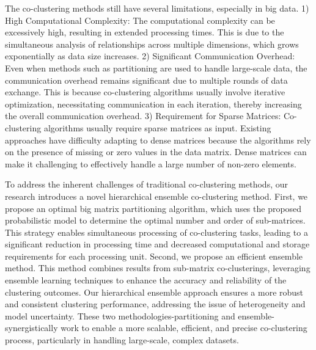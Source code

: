 The co-clustering methods still have several limitations, especially in big data. 
1) High Computational Complexity: The computational complexity can be excessively high, resulting in extended processing times. This is due to the simultaneous analysis of relationships across multiple dimensions, which grows exponentially as data size increases.
2) Significant Communication Overhead: Even when methods such as partitioning are used to handle large-scale data, the communication overhead remains significant due to multiple rounds of data exchange. This is because co-clustering algorithms usually involve iterative optimization, necessitating communication in each iteration, thereby increasing the overall communication overhead.
3) Requirement for Sparse Matrices: Co-clustering algorithms usually require sparse matrices as input. Existing approaches have difficulty adapting to dense matrices because the algorithms rely on the presence of missing or zero values in the data matrix. Dense matrices can make it challenging to effectively handle a large number of non-zero elements.

To address the inherent challenges of traditional co-clustering methods, our research introduces a novel hierarchical ensemble co-clustering method. First,  we propose an optimal big matrix partitioning algorithm, which uses the proposed probabilistic model to determine the optimal number and order of sub-matrices. This strategy enables simultaneous processing of co-clustering tasks, leading to a significant reduction in processing time and decreased computational and storage requirements for each processing unit.  
Second, we propose an efficient ensemble method. This method combines results from sub-matrix co-clusterings, leveraging ensemble learning techniques to enhance the accuracy and reliability of the clustering outcomes. Our hierarchical ensemble approach ensures a more robust and consistent clustering performance, addressing the issue of heterogeneity and model uncertainty. 
These two methodologies-partitioning and ensemble-synergistically work to enable a more scalable, efficient, and precise co-clustering process, particularly in handling large-scale, complex datasets.

